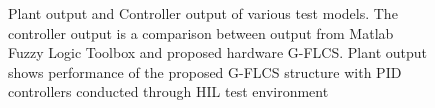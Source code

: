 \begin{figure}[h!]
	\centering
	 \qquad 
	\caption{Plant output and Controller output of various test models. The controller output is a comparison between output from Matlab Fuzzy Logic Toolbox and proposed hardware G-FLCS. Plant output shows performance of the proposed G-FLCS structure with PID controllers conducted through HIL test environment} 
	\label{fig:CompOut_wind}
\end{figure}

